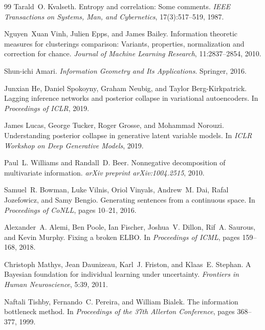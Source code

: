 \documentclass[10pt]{article} %
\theoremstyle{plain}
\theoremstyle{definition}
\begin{document}
\begin{thebibliography}{99}
Tarald~O. Kvalseth.
\newblock Entropy and correlation: Some comments.
\newblock \emph{IEEE Transactions on Systems, Man, and Cybernetics}, 17(3):517--519, 1987.

Nguyen~Xuan Vinh, Julien Epps, and James Bailey.
\newblock Information theoretic measures for clusterings comparison: Variants, properties, normalization and correction for chance.
\newblock \emph{Journal of Machine Learning Research}, 11:2837--2854, 2010.

Shun-ichi Amari.
\newblock \emph{Information Geometry and Its Applications}.
\newblock Springer, 2016.

Junxian He, Daniel Spokoyny, Graham Neubig, and Taylor Berg-Kirkpatrick.
\newblock Lagging inference networks and posterior collapse in variational autoencoders.
\newblock In \emph{Proceedings of ICLR}, 2019.

James Lucas, George Tucker, Roger Grosse, and Mohammad Norouzi.
\newblock Understanding posterior collapse in generative latent variable models.
\newblock In \emph{ICLR Workshop on Deep Generative Models}, 2019.

Paul~L. Williams and Randall~D. Beer.
\newblock Nonnegative decomposition of multivariate information.
\newblock \emph{arXiv preprint arXiv:1004.2515}, 2010.

Samuel~R. Bowman, Luke Vilnis, Oriol Vinyals, Andrew~M. Dai, Rafal Jozefowicz, and Samy Bengio.
\newblock Generating sentences from a continuous space.
\newblock In \emph{Proceedings of CoNLL}, pages 10--21, 2016.

Alexander~A. Alemi, Ben Poole, Ian Fischer, Joshua~V. Dillon, Rif~A. Saurous, and Kevin Murphy.
\newblock Fixing a broken {ELBO}.
\newblock In \emph{Proceedings of ICML}, pages 159--168, 2018.

Christoph Mathys, Jean Daunizeau, Karl~J. Friston, and Klaas~E. Stephan.
\newblock A {B}ayesian foundation for individual learning under uncertainty.
\newblock \emph{Frontiers in Human Neuroscience}, 5:39, 2011.

Naftali Tishby, Fernando~C. Pereira, and William Bialek.
\newblock The information bottleneck method.
\newblock In \emph{Proceedings of the 37th Allerton Conference}, pages 368--377, 1999.


\end{thebibliography}
\end{document}
